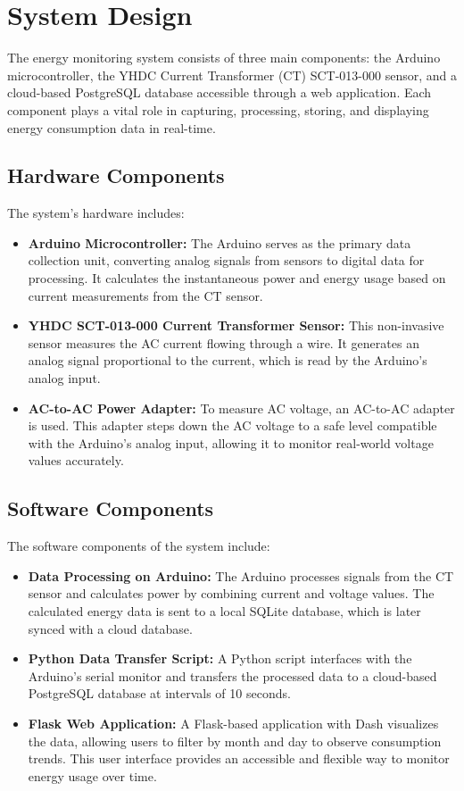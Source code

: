 \section{System Design}
\label{sec:system_design}

\noindent The energy monitoring system consists of three main components:
the Arduino microcontroller, the YHDC Current Transformer (CT) SCT-013-000 sensor, and a cloud-based PostgreSQL database accessible through a web application. Each component plays a vital role in capturing, processing, storing, and displaying energy consumption data in real-time.

\subsection{Hardware Components}
\noindent The system's hardware includes:
\begin{itemize}
    \item \textbf{Arduino Microcontroller:} The Arduino serves as the primary data collection unit, converting analog signals from sensors to digital data for processing. It calculates the instantaneous power and energy usage based on current measurements from the CT sensor.
    \item \textbf{YHDC SCT-013-000 Current Transformer Sensor:} This non-invasive sensor measures the AC current flowing through a wire. It generates an analog signal proportional to the current, which is read by the Arduino's analog input.
    \item \textbf{AC-to-AC Power Adapter:} To measure AC voltage, an AC-to-AC adapter is used. This adapter steps down the AC voltage to a safe level compatible with the Arduino's analog input, allowing it to monitor real-world voltage values accurately.
\end{itemize}

\subsection{Software Components}
\noindent The software components of the system include:
\begin{itemize}
    \item \textbf{Data Processing on Arduino:} The Arduino processes signals from the CT sensor and calculates power by combining current and voltage values. The calculated energy data is sent to a local SQLite database, which is later synced with a cloud database.
    \item \textbf{Python Data Transfer Script:} A Python script interfaces with the Arduino's serial monitor and transfers the processed data to a cloud-based PostgreSQL database at intervals of 10 seconds.
    \item \textbf{Flask Web Application:} A Flask-based application with Dash visualizes the data, allowing users to filter by month and day to observe consumption trends. This user interface provides an accessible and flexible way to monitor energy usage over time.
\end{itemize}

